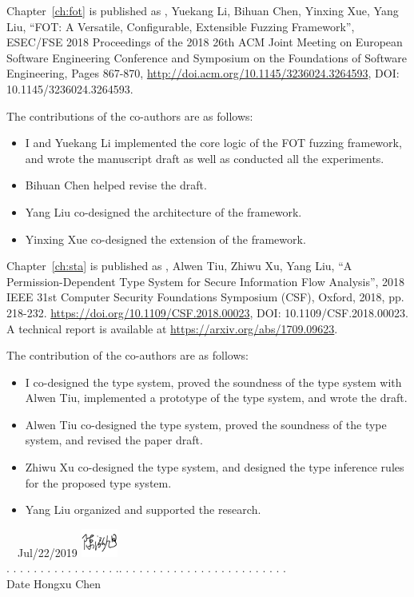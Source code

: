 \noindent Chapter~\ref{ch:fot} is published as \myname, Yuekang Li, Bihuan Chen, Yinxing Xue, Yang Liu, ``FOT: A Versatile, Configurable, Extensible Fuzzing Framework'', ESEC/FSE 2018 Proceedings of the 2018 26th ACM Joint Meeting on European Software Engineering Conference and Symposium on the Foundations of Software Engineering, Pages 867-870, \url{http://doi.acm.org/10.1145/3236024.3264593}, DOI: 10.1145/3236024.3264593.

\noindent The contributions of the co-authors are as follows:
\begin{itemize}
	\item I and Yuekang Li implemented the core logic of the FOT fuzzing framework, and wrote the manuscript draft as well as conducted all the experiments.
	\item Bihuan Chen helped revise the draft.
	\item Yang Liu co-designed the architecture of the framework.
	\item Yinxing Xue co-designed the \dFOT extension of the framework.
\end{itemize}

\noindent Chapter~\ref{ch:sta} is published as \myname, Alwen Tiu, Zhiwu Xu, Yang Liu, ``A Permission-Dependent Type System for Secure Information Flow Analysis'', 2018 IEEE 31st Computer Security Foundations Symposium (CSF), Oxford, 2018, pp. 218-232. \url{https://doi.org/10.1109/CSF.2018.00023}, DOI: 10.1109/CSF.2018.00023. A technical report is available at \url{https://arxiv.org/abs/1709.09623}.

\noindent The contribution of the co-authors are as follows:
\begin{itemize}
	\item I co-designed the type system, proved the soundness of the type system with Alwen Tiu, implemented a prototype of the type system, and wrote the draft.
	\item Alwen Tiu co-designed the type system, proved the soundness of the type system, and revised the paper draft.
	\item Zhiwu Xu co-designed the type system, and designed the type inference rules for the proposed type system.
	\item Yang Liu organized and supported the research.
\end{itemize}

\vspace{150pt}

 \ \    
Jul/22/2019  \qquad \qquad \qquad \qquad\qquad\qquad \qquad \qquad \qquad \qquad
\includegraphics[width=0.09\textwidth]{res/sig_en.pdf}
\\
. . . . . . . . . . . . . . . . .\qquad \qquad \qquad \qquad\qquad \qquad . . . .  . . . . . . . . . . . . . . . . . . . . .\\
\indent \qquad Date \qquad \qquad \qquad  \qquad \qquad \qquad\qquad\qquad\qquad\qquad Hongxu Chen

